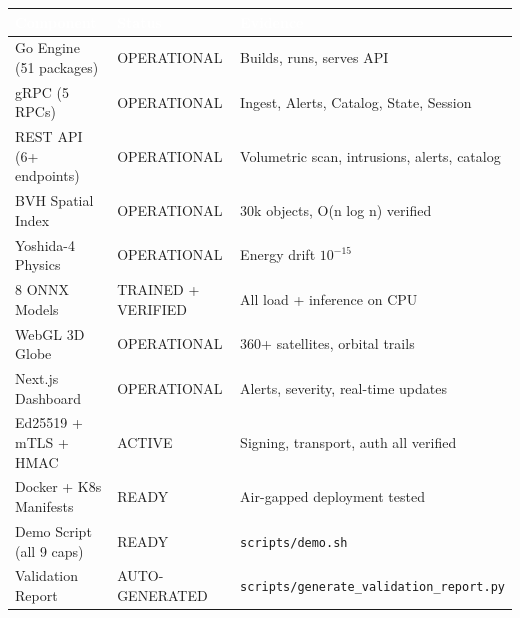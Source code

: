 \documentclass[11pt,a4paper]{article}
\newcommand{\TH}[1]{\textcolor{white}{\textbf{#1}}}
\begin{document}
\begin{table}[H]\centering\small
\begin{tabularx}{\textwidth}{|p{4.5cm}|p{2.8cm}|X|}
\hline
\rowcolor{dblue}\TH{Component} & \TH{Status} & \TH{Evidence} \\
\hline
Go Engine (51 packages) & \textcolor{dgreen}{OPERATIONAL} & Builds, runs, serves API \\
\hline
gRPC (5 RPCs) & \textcolor{dgreen}{OPERATIONAL} & Ingest, Alerts, Catalog, State, Session \\
\hline
REST API (6+ endpoints) & \textcolor{dgreen}{OPERATIONAL} & Volumetric scan, intrusions, alerts, catalog \\
\hline
BVH Spatial Index & \textcolor{dgreen}{OPERATIONAL} & 30k objects, O(n log n) verified \\
\hline
Yoshida-4 Physics & \textcolor{dgreen}{OPERATIONAL} & Energy drift $10^{-15}$ \\
\hline
8 ONNX Models & \textcolor{dgreen}{TRAINED + VERIFIED} & All load + inference on CPU \\
\hline
WebGL 3D Globe & \textcolor{dgreen}{OPERATIONAL} & 360+ satellites, orbital trails \\
\hline
Next.js Dashboard & \textcolor{dgreen}{OPERATIONAL} & Alerts, severity, real-time updates \\
\hline
Ed25519 + mTLS + HMAC & \textcolor{dgreen}{ACTIVE} & Signing, transport, auth all verified \\
\hline
Docker + K8s Manifests & \textcolor{dgreen}{READY} & Air-gapped deployment tested \\
\hline
Demo Script (all 9 caps) & \textcolor{dgreen}{READY} & \texttt{scripts/demo.sh} \\
\hline
Validation Report & \textcolor{dgreen}{AUTO-GENERATED} & \texttt{scripts/generate\_validation\_report.py} \\
\hline
\end{tabularx}
\end{table}
\end{document}
